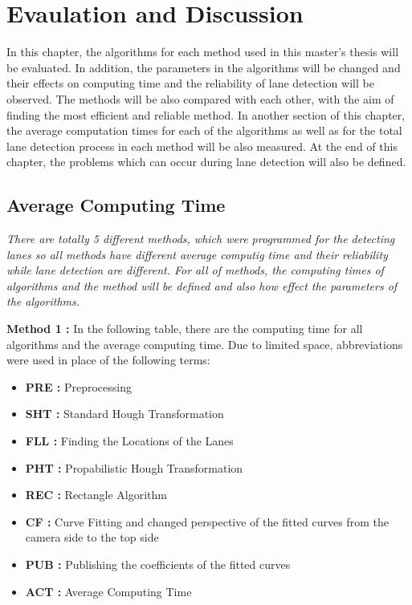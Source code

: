 
%
\chapter{Evaulation and Discussion}
\label{cha:Evaulation and Discussion}

In this chapter, the algorithms for each method used in this master's thesis will be evaluated. In addition, the parameters in the algorithms will be changed and their effects on computing time and the reliability of lane detection will be observed. The methods will be also compared with each other, with the aim of finding the most efficient and reliable method. In another section of this chapter, the average computation times for each of the algorithms as well as for the total lane detection process in each method will be also measured. At the end of this chapter, the problems which can occur during lane detection will also be defined.
%

\section{Average Computing Time}\label{sec:Average Computing Time}

\emph{\color{blue}There are totally 5 different methods, which were programmed for the detecting lanes so all methods have different average computig time and their reliability while lane detection are different. For all of methods, the computing times of algorithms and the method will be defined and also how effect  the parameters of the algorithms.}


\textbf{Method 1 : }In the following table, there are the computing time for all algorithms and the average computing time. Due to limited space, abbreviations were used in place of the following terms:


\begin{itemize}[noitemsep]
\item\textbf{PRE : }Preprocessing
\item\textbf{SHT : }Standard Hough Transformation
\item\textbf{FLL : }Finding the Locations of the Lanes
\item\textbf{PHT : }Propabilistic Hough Transformation
\item\textbf{REC : }Rectangle Algorithm
\item\textbf{CF : }Curve Fitting and changed perspective of the fitted curves from the camera side to the top side 
\item\textbf{PUB : }Publishing the coefficients of the fitted curves
\item\textbf{ACT : }Average Computing Time
\end{itemize}

